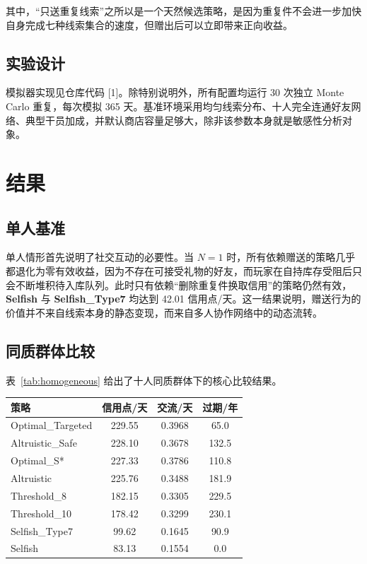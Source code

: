 \documentclass{rubbish}
\begin{document}
\begin{rubbishbody}
其中，“只送重复线索”之所以是一个天然候选策略，是因为重复件不会进一步加快自身完成七种线索集合的速度，但赠出后可以立即带来正向收益。

\subsection{实验设计}

模拟器实现见仓库代码 [1]。除特别说明外，所有配置均运行 30 次独立 Monte Carlo 重复，每次模拟 365 天。基准环境采用均匀线索分布、十人完全连通好友网络、典型干员加成，并默认商店容量足够大，除非该参数本身就是敏感性分析对象。

\section{结果}

\subsection{单人基准}

单人情形首先说明了社交互动的必要性。当 $N=1$ 时，所有依赖赠送的策略几乎都退化为零有效收益，因为不存在可接受礼物的好友，而玩家在自持库存受阻后只会不断堆积待入库队列。此时只有依赖“删除重复件换取信用”的策略仍然有效，\textbf{Selfish} 与 \textbf{Selfish\_Type7} 均达到 42.01 信用点/天。这一结果说明，赠送行为的价值并不来自线索本身的静态变现，而来自多人协作网络中的动态流转。

\subsection{同质群体比较}

表~\ref{tab:homogeneous} 给出了十人同质群体下的核心比较结果。

\noindent
\begin{minipage}{\columnwidth}
\label{tab:homogeneous}
\vspace{2pt}
\centering
\small
\begin{tabular}{@{}lccc@{}}
  \toprule
  \textbf{策略} & \textbf{信用点/天} & \textbf{交流/天} & \textbf{过期/年} \\
  \midrule
  Optimal\_Targeted & 229.55 & 0.3968 & 65.0 \\
  Altruistic\_Safe  & 228.10 & 0.3678 & 132.5 \\
  Optimal\_S*       & 227.33 & 0.3786 & 110.8 \\
  Altruistic        & 225.76 & 0.3488 & 181.9 \\
  Threshold\_8      & 182.15 & 0.3305 & 229.5 \\
  Threshold\_10     & 178.42 & 0.3299 & 230.1 \\
  Selfish\_Type7    & 99.62  & 0.1645 & 90.9 \\
  Selfish           & 83.13  & 0.1554 & 0.0 \\
  \bottomrule
\end{tabular}
\end{minipage}


\end{rubbishbody}
\end{document}
